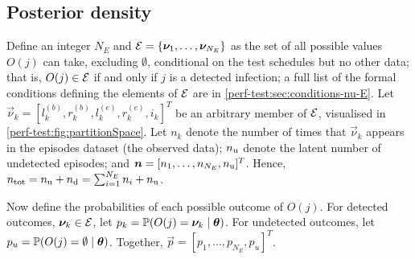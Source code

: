 \documentclass[thesis.tex]{subfiles}
\begin{document}
\subsection{Posterior density} \label{perf-test:sec:posterior}

Define an integer $N_E$ and $\mathcal{E} = \{ \bm{\nu}_1, \dots, \bm{\nu}_{N_E} \}$ as the set of all possible values $O(j)$ can take, excluding $\emptyset$, conditional on the test schedules but no other data; that is, $O(j) \in \mathcal{E}$ if and only if $j$ is a detected infection; a full list of the formal conditions defining the elements of $\mathcal{E}$ are in \cref{perf-test:sec:conditions-nu-E}.
Let $\vec{\nu}_k = [l^{(b)}_k, r^{(b)}_k, l^{(e)}_k, r^{(e)}_k, i_k]^T$ be an arbitrary member of $\mathcal{E}$, visualised in \cref{perf-test:fig:partitionSpace}.
Let $n_k$ denote the number of times that $\vec{\nu}_k$ appears in the episodes dataset (\ie the observed data); $n_\text{u}$ denote the latent number of undetected episodes; and $\bm{n} = [n_1, \dots, n_{N_E}, n_\text{u}]^T$.
Hence, $n_\text{tot} = n_\text{u} + n_\text{d} = \sum_{i=1}^{N_E} n_i + n_\text{u}$.

Now define the probabilities of each possible outcome of $O(j)$.
For detected outcomes, \ie $\bm{\nu}_k \in \mathcal{E}$, let $p_k = \operatorname{\mathbb{P}}(O(j) = \bm{\nu}_k \mid \bm{\theta})$.
For undetected outcomes, let $p_u = \operatorname{\mathbb{P}}(O(j) = \emptyset \mid \bm{\theta})$.
Together, $\vec{p} = [p_1, \dots, p_{N_E}, p_u]^T$.
\end{document}
